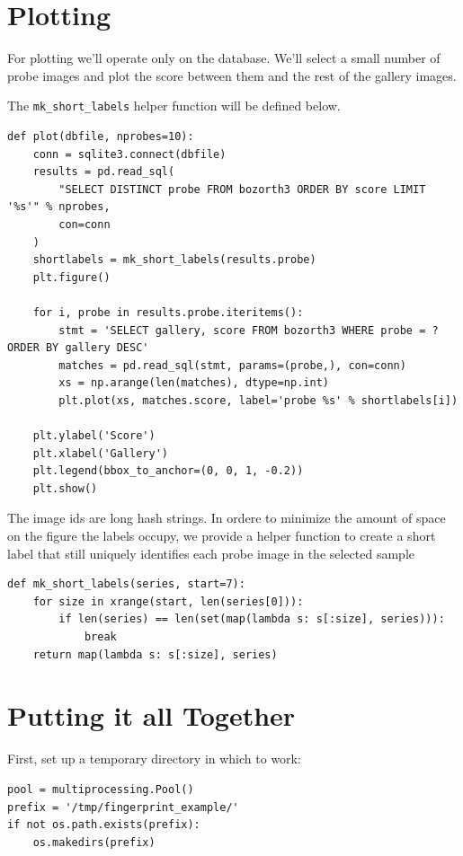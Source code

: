 \section{Plotting}\label{plotting}

For plotting we'll operate only on the database. We'll select a small
number of probe images and plot the score between them and the rest of
the gallery images.

The \texttt{mk\_short\_labels} helper function will be defined below.

\begin{verbatim}
def plot(dbfile, nprobes=10):
    conn = sqlite3.connect(dbfile)
    results = pd.read_sql(
        "SELECT DISTINCT probe FROM bozorth3 ORDER BY score LIMIT '%s'" % nprobes,
        con=conn
    )
    shortlabels = mk_short_labels(results.probe)
    plt.figure()

    for i, probe in results.probe.iteritems():
        stmt = 'SELECT gallery, score FROM bozorth3 WHERE probe = ? ORDER BY gallery DESC'
        matches = pd.read_sql(stmt, params=(probe,), con=conn)
        xs = np.arange(len(matches), dtype=np.int)
        plt.plot(xs, matches.score, label='probe %s' % shortlabels[i])

    plt.ylabel('Score')
    plt.xlabel('Gallery')
    plt.legend(bbox_to_anchor=(0, 0, 1, -0.2))
    plt.show()
\end{verbatim}

The image ids are long hash strings. In ordere to minimize the amount of
space on the figure the labels occupy, we provide a helper function to
create a short label that still uniquely identifies each probe image in
the selected sample

\begin{verbatim}
def mk_short_labels(series, start=7):
    for size in xrange(start, len(series[0])):
        if len(series) == len(set(map(lambda s: s[:size], series))):
            break
    return map(lambda s: s[:size], series)
\end{verbatim}

\section{Putting it all Together}\label{putting-it-all-together}

First, set up a temporary directory in which to work:

\begin{verbatim}
pool = multiprocessing.Pool()
prefix = '/tmp/fingerprint_example/'
if not os.path.exists(prefix):
    os.makedirs(prefix)
\end{verbatim}

